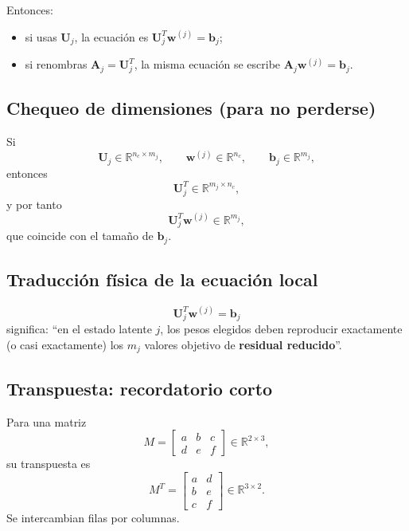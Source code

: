 \documentclass[11pt,a4paper]{article}
\newcommand{\A}{\bm A}
\newcommand{\U}{\bm U}
\begin{document}
Entonces:
\begin{itemize}[leftmargin=0.8cm]
    \item si usas $\U_j$, la ecuaci\'on es $\U_j^T\bm w^{(j)}=\bm b_j$;
    \item si renombras $\A_j=\U_j^T$, la misma ecuaci\'on se escribe $\A_j\bm w^{(j)}=\bm b_j$.
\end{itemize}

\subsection{Chequeo de dimensiones (para no perderse)}
Si
\[
\U_j\in\mathbb R^{n_c\times m_j},\qquad
\bm w^{(j)}\in\mathbb R^{n_c},\qquad
\bm b_j\in\mathbb R^{m_j},
\]
entonces
\[
\U_j^T\in\mathbb R^{m_j\times n_c},
\]
y por tanto
\[
\U_j^T\bm w^{(j)}\in\mathbb R^{m_j},
\]
que coincide con el tama\~no de $\bm b_j$.

\subsection{Traducci\'on f\'isica de la ecuaci\'on local}
\[
\U_j^T\bm w^{(j)}=\bm b_j
\]
significa: ``en el estado latente $j$, los pesos elegidos deben reproducir
exactamente (o casi exactamente) los $m_j$ valores objetivo de \textbf{residual reducido}''.

\subsection{Transpuesta: recordatorio corto}
Para una matriz
\[
M=
\begin{bmatrix}
a & b & c\\
d & e & f
\end{bmatrix}
\in\mathbb R^{2\times 3},
\]
su transpuesta es
\[
M^T=
\begin{bmatrix}
a & d\\
b & e\\
c & f
\end{bmatrix}
\in\mathbb R^{3\times 2}.
\]
Se intercambian filas por columnas.
\end{document}
